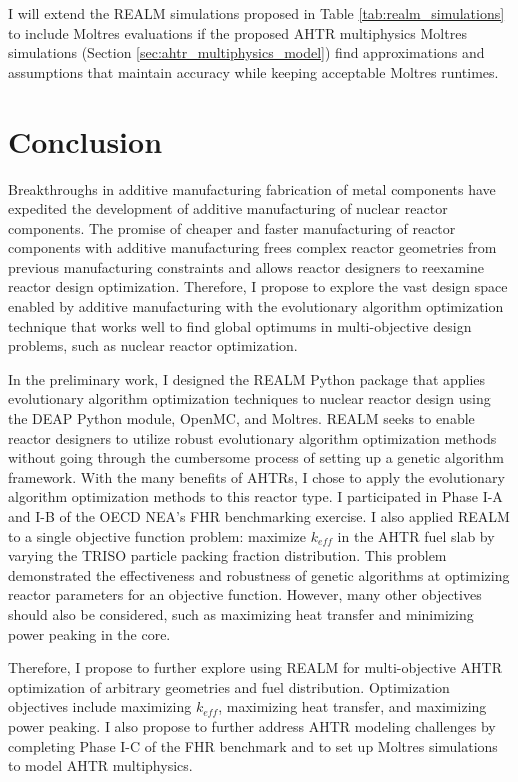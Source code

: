 I will extend the REALM simulations proposed in Table \ref{tab:realm_simulations} 
to include Moltres evaluations if the proposed \gls{AHTR} multiphysics
Moltres simulations (Section \ref{sec:ahtr_multiphysics_model}) find approximations 
and assumptions that maintain accuracy while keeping acceptable Moltres runtimes.

\section{Conclusion}
Breakthroughs in additive manufacturing fabrication of metal components have 
expedited the development of additive manufacturing of nuclear reactor components.
The promise of cheaper and faster manufacturing of reactor components with 
additive manufacturing frees complex reactor geometries from previous manufacturing 
constraints and allows reactor designers to reexamine reactor design optimization. 
Therefore, I propose to explore the vast design space enabled by 
additive manufacturing with the evolutionary algorithm optimization technique 
that works well to find global optimums in multi-objective design problems, 
such as nuclear reactor optimization. 

In the preliminary work, I designed the \gls{REALM} Python package that applies 
evolutionary algorithm optimization techniques to nuclear reactor design using 
the \gls{DEAP} Python module, OpenMC, and Moltres.
\gls{REALM} seeks to enable reactor designers to utilize 
robust evolutionary algorithm optimization methods without going 
through the cumbersome process of setting up a genetic algorithm framework.
With the many benefits of \glspl{AHTR}, I chose to apply the evolutionary 
algorithm optimization methods to this reactor type.
I participated in Phase I-A and I-B of the \acrfull{OECD} \gls{NEA}'s \gls{FHR} 
benchmarking exercise. 
I also applied \gls{REALM} to a single objective function problem: maximize 
$k_{eff}$ in the \gls{AHTR} fuel slab by varying the \gls{TRISO} particle 
packing fraction distribution. 
This problem demonstrated the effectiveness and robustness of genetic algorithms 
at optimizing reactor parameters for an objective function. 
However, many other objectives should also be considered, such as maximizing heat 
transfer and minimizing power peaking in the core.

Therefore, I propose to further explore using \gls{REALM} for multi-objective 
\gls{AHTR} optimization of arbitrary geometries and fuel distribution.
Optimization objectives include maximizing $k_{eff}$, maximizing heat transfer, 
and maximizing power peaking. 
I also propose to further address \gls{AHTR} modeling challenges by completing 
Phase I-C of the \gls{FHR} benchmark and to set up Moltres simulations to model 
\gls{AHTR} multiphysics.